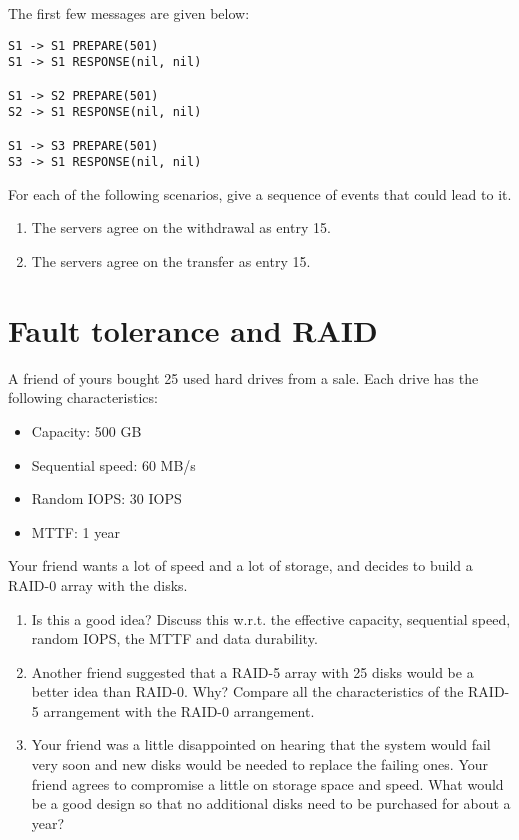 \documentclass{article}
\begin{document}
\begin{enumerate}
The first few messages are given below:
\begin{verbatim}
S1 -> S1 PREPARE(501) 
S1 -> S1 RESPONSE(nil, nil)

S1 -> S2 PREPARE(501) 
S2 -> S1 RESPONSE(nil, nil)

S1 -> S3 PREPARE(501) 
S3 -> S1 RESPONSE(nil, nil)
\end{verbatim}

For each of the following scenarios, give a sequence of events that could
lead to it.
\begin{enumerate}
\item The servers agree on the withdrawal as entry 15.
\item The servers agree on the transfer as entry 15.
\end{enumerate}
\end{enumerate}


\section{Fault tolerance and RAID}
A friend of yours bought 25 used hard drives from a sale. Each drive has the
following characteristics:
\begin{itemize}
\item Capacity: 500 GB
\item Sequential speed: 60 MB/s
\item Random IOPS: 30 IOPS
\item MTTF: 1 year
\end{itemize}
Your friend wants a lot of speed and a lot of storage, and decides to 
build a RAID-0 array with the disks.
\begin{enumerate}
\item Is this a good idea? Discuss this w.r.t. the effective capacity,
sequential speed, random IOPS, the MTTF and data durability.
\item Another friend suggested that a RAID-5 array with 25 disks would be a better idea
than RAID-0. Why? Compare all the characteristics of the RAID-5 arrangement with the RAID-0
arrangement.
\item Your friend was a little disappointed on hearing that the system would fail
very soon and new disks would be needed to replace the failing ones. Your friend agrees to
compromise a little on storage space and speed. What would be a good design so that
no additional disks need to be purchased for about a year?
\end{enumerate}

\clearpage
\end{document}
